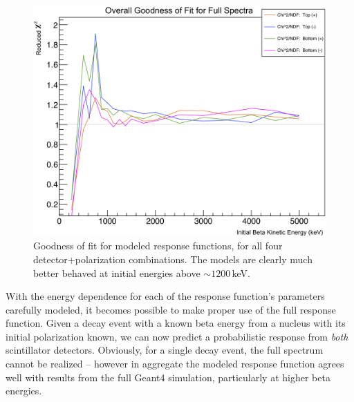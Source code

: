 \begin{figure}[h!!tb]
	\centering
	\includegraphics[width=.999\linewidth]
	{Figures/Lineshape_Chi2.png}
	\caption[Goodness of Fit for Modeled Response Functions]{Goodness of fit for modeled response functions, for all four detector+polarization combinations.  The models are clearly much better behaved at initial energies above $\sim 1200\,$keV.}	
	\label{fig:lineshape_redchi2}
\end{figure}


With the energy dependence for each of the response function's parameters carefully modeled, it becomes possible to make proper use of the full response function.  Given a decay event with a known beta energy from a nucleus with its initial polarization known, we can now predict a probabilistic response from \emph{both} scintillator detectors.  Obviously, for a single decay event, the full spectrum cannot be realized -- however in aggregate the modeled response function agrees well with results from the full Geant4 simulation, particularly at higher beta energies.  


